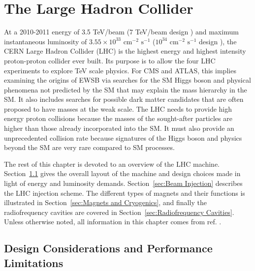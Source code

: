\documentclass[dissertation.tex]{subfiles}
\begin{document}
\chapter{The Large Hadron Collider}
\label{chap:The Large Hadron Collider}

\thispagestyle{myheadings}
\markright{\hfill}

At a 2010-2011 energy of 3.5 TeV/beam (7 TeV/beam design \cite{1748-0221-3-08-S08001}) and maximum instantaneous luminosity of $3.55 \times 10^{33}\mbox{ cm}^{-2}\mbox{ s}^{-1}$ \cite{CMS_2011_summary} ($10^{34}\mbox{ cm}^{-2}\mbox{ s}^{-1}$ design \cite{1748-0221-3-08-S08001}), the CERN Large Hadron Collider (LHC) is the highest energy and highest intensity proton-proton collider ever built.  Its purpose is to allow the four LHC experiments to explore TeV scale physics.  For CMS and ATLAS, this implies examining the origins of EWSB via searches for the SM Higgs boson and physical phenomena not predicted by the SM that may explain the mass hierarchy in the SM.  It also includes searches for possible dark matter candidates that are often proposed to have masses at the weak scale.  The LHC needs to provide high energy proton collisions because the masses of the sought-after particles are higher than those already incorporated into the SM.  It must also provide an unprecedented collision rate because signatures of the Higgs boson and physics beyond the SM are very rare compared to SM processes.

The rest of this chapter is devoted to an overview of the LHC machine.  Section~\ref{sec:Design Considerations and Performance Limitations} gives the overall layout of the machine and design choices made in light of energy and luminosity demands.  Section~\ref{sec:Beam Injection} describes the LHC injection scheme.  The different types of magnets and their functions is illustrated in Section~\ref{sec:Magnets and Cryogenics}, and finally the radiofrequency cavities are covered in Section~\ref{sec:Radiofrequency Cavities}.  Unless otherwise noted, all information in this chapter comes from ref. \cite{1748-0221-3-08-S08001}.

\section{Design Considerations and Performance Limitations}
\label{sec:Design Considerations and Performance Limitations}
\end{document}
